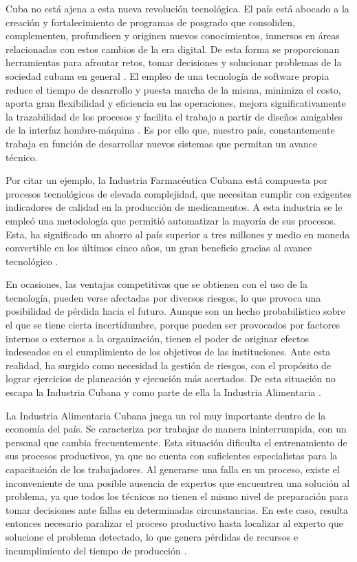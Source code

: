 \documentclass[12pt,a4paper]{report}
\begin{document}
Cuba no está ajena a esta nueva revolución tecnológica. El país está abocado a la creación y fortalecimiento de programas de posgrado que consoliden, complementen, profundicen y originen nuevos conocimientos, inmersos en áreas relacionadas con estos cambios de la era digital. De esta forma se proporcionan herramientas para afrontar retos, tomar decisiones y solucionar problemas de la sociedad cubana en general \cite{avanceTecnologico}.
El empleo de una tecnología de software propia reduce el tiempo de desarrollo y puesta marcha de la misma, minimiza el costo, aporta gran flexibilidad y eficiencia en las operaciones, mejora significativamente la trazabilidad de los procesos y facilita el trabajo a partir de diseños amigables de la interfaz hombre-máquina \cite{industriaCubana}.
Es por ello que, nuestro país, constantemente trabaja en función de desarrollar nuevos sistemas que permitan un avance técnico.

Por citar un ejemplo, la Industria Farmacéutica Cubana está compuesta por procesos tecnológicos de elevada complejidad, que necesitan cumplir con exigentes indicadores de calidad en la producción de medicamentos. A esta industria se le empleó una metodología que permitió automatizar la mayoría de sus procesos. Esta, ha significado un ahorro al país superior a tres millones y medio en moneda convertible en los últimos cinco años, un gran beneficio gracias al avance tecnológico \cite{industriaFarmceutica}.

En ocasiones, las ventajas competitivas que se obtienen con el uso de la tecnología, pueden verse afectadas por diversos riesgos, lo que provoca una posibilidad de pérdida hacia el futuro. Aunque son un hecho probabilístico sobre el que se tiene cierta incertidumbre, porque pueden ser provocados por factores internos o externos a la organización, tienen el poder de originar efectos indeseados en el cumplimiento de los objetivos de las instituciones. 
Ante esta realidad, ha surgido como necesidad la gestión de riesgos, con el propósito de lograr ejercicios de planeación y ejecución más acertados.
De esta situación no escapa la Industria Cubana y como parte de ella la Industria Alimentaria \cite{CONVENCION2019}.

La Industria Alimentaria Cubana juega un rol muy importante dentro de la economía del país. Se caracteriza por trabajar de manera ininterrumpida, con un personal que cambia frecuentemente. Esta situación dificulta el entrenamiento de sus procesos productivos, ya que no cuenta con suficientes especialistas para la capacitación de los trabajadores. Al generarse una falla en un proceso, existe el inconveniente de una posible ausencia de expertos que encuentren una solución al problema, ya que todos los técnicos no tienen el mismo nivel de preparación para tomar decisiones ante fallas en determinadas circunstancias. En este caso, resulta entonces necesario paralizar el proceso productivo hasta localizar al experto que solucione el problema detectado, lo que genera pérdidas de recursos e incumplimiento del tiempo de producción \cite{gestorBases}.
\end{document}
